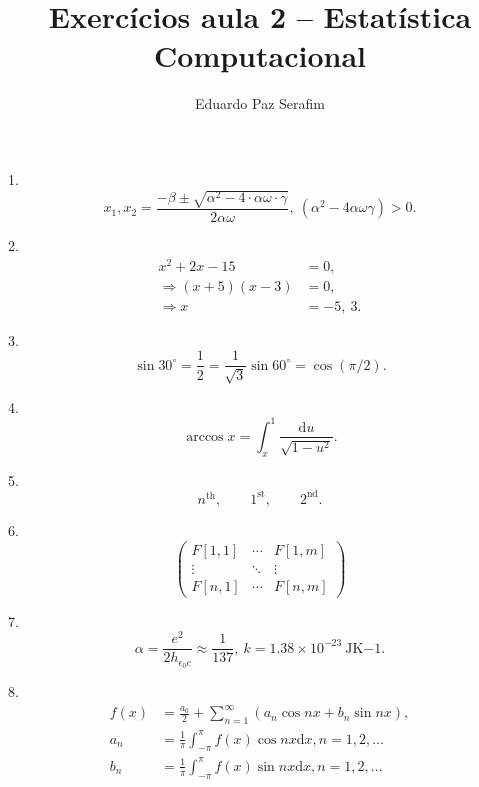\documentclass[12pt,a4paper]{article}
\title{Exercícios aula 2 -- Estatística Computacional}
\author{Eduardo Paz Serafim}
\date{}
\begin{document}
	
\maketitle	

1. 
$$ x_1, x_2 = \dfrac{ -\beta \pm \sqrt{\alpha^2 -4 \cdot \alpha \omega \cdot \gamma}}{2 \alpha \omega}, \ (\alpha^2 -4 \alpha \omega \gamma) > 0. $$


2.
\begin{align}
         x^2 + 2x - 15 &= 0,  \\
\Rightarrow (x+5)(x-3) &= 0, \nonumber  \\
         \Rightarrow x &= -5,\ 3.
\end{align}


3. 
\begin{equation*}
\sin 30^\circ = \frac{1}{2} = \frac{1}{\sqrt{3}}\sin 60^\circ = \cos (\pi / 2).
\end{equation*}

4.
\begin{equation*}
\arccos x = \int_x^1 \frac{\mathrm{d}u}{\sqrt{1-u^2}}.
\end{equation*}

5.
\begin{equation*}
n^\mathrm{th}, \qquad 1^\mathrm{st}, \qquad 2^\mathrm{nd}.
\end{equation*}

6.
\begin{equation*}
\begin{pmatrix}
F[1,1] & \cdots & F[1,m] \\
\vdots & \ddots & \vdots \\
F[n,1] & \cdots & F[n,m] 
\end{pmatrix}
\end{equation*}


7.
\begin{equation*}
\alpha = \frac{e^2}{2h_{\epsilon_0c}} \approx \frac{1}{137}, \ k=1.38 \times 10^{-23}\ \mathrm{JK}{-1}.
\end{equation*}

8.
\begin{align*}
f(x) &= \frac{a_0}{2} + \sum_{n=1}^{\infty}(a_n \cos nx + b_n \sin nx), \\
 a_n &= \frac{1}{\pi} \int_{-\pi}^{\pi} f(x) \cos nx \mathrm{d}x, n = 1,2,\dots \\
 b_n &= \frac{1}{\pi} \int_{-\pi}^{\pi} f(x) \sin nx \mathrm{d}x, n = 1,2,\dots
\end{align*}
\end{document}
